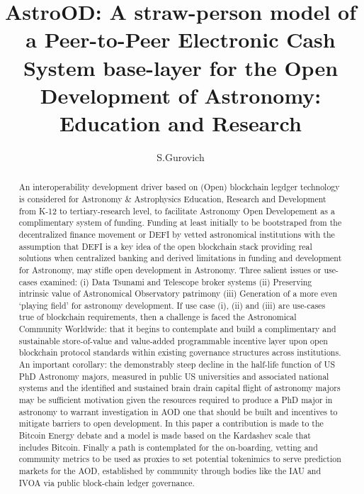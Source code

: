 \documentclass[final,5p,times,twocolumn,authoryear]{elsarticle}
\begin{document}
\begin{frontmatter}

\title{ AstroOD: A straw-person model of a Peer-to-Peer Electronic Cash System base-layer for the Open Development of Astronomy: Education and Research}
 
    \author[iate,wsu]{S.Gurovich}
  
\address[iate]{
   Instituto De Astronom\'ia Te\'orica y Experimental -
   Observatorio Astron\'omico C\'ordoba (IATE--OAC--UNC--CONICET),
   Laprida 854, X5000BGR, C\'ordoba, Argentina}
\address[wsu]{
   Western Sydney University, Kingswood campus, NSW, Australia
}

\begin{abstract}

An interoperability  development driver based on (Open) blockchain legdger technology is considered for Astronomy \& Astrophysics Education, Research and Development from K-12 to tertiary-research level, to facilitate Astronomy Open Developement as a complimentary system of funding. Funding at least initially to be bootstraped from the decentralized finance movement or DEFI by vetted astronomical institutions with the assumption that DEFI is a key idea of the open blockchain stack providing real solutions when centralized banking and derived limitations in funding and development for Astronomy, may stifle open development in Astronomy. Three salient issues or use-cases examined: (i) Data Tsunami and Telescope broker systems (ii) Preserving intrinsic value of Astronomical Observatory patrimony  (iii) Generation of a more even `playing field' for astronomy development. If use case (i), (ii) and (iii) are use-cases true of blockchain requirements, then a challenge is faced the Astronomical Community Worldwide: that it begins to contemplate and build a complimentary and sustainable store-of-value and value-added programmable incentive layer upon open blockchain protocol standards within existing governance structures across institutions. An important corollary: the demonstrably steep decline in the half-life function of US PhD Astronomy majors, measured in public US universities and associated national systems and the identified and sustained brain drain capital flight of astronomy majors may be sufficient motivation given the resources required to produce a PhD major in astronomy to warrant investigation in AOD one that should be built and incentives to mitigate barriers to open development. In this paper a contribution is made to the Bitcoin Energy debate and a model is made based on the Kardashev scale that includes Bitcoin. Finally a path is contemplated for the on-boarding, vetting and community metrics to be used as proxies to set potential tokenimics to serve prediction markets for the AOD, established by community through bodies like the IAU and IVOA via public  block-chain ledger governance. 


\end{abstract}
\end{frontmatter}
\end{document}
